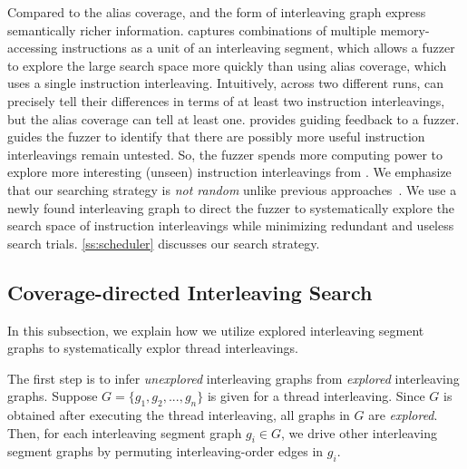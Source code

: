 %
%
Compared to the alias coverage, \intcov and the form of interleaving graph
express semantically richer information. \Intcov captures combinations 
of multiple memory-accessing instructions as a unit of an interleaving segment, which allows a fuzzer to explore the large search space more quickly than using alias coverage, which uses a single instruction interleaving. Intuitively, across two different runs, \intcov can precisely tell 
their differences in terms of at least two instruction interleavings, 
but the alias coverage can tell at least one.
\Intcov provides guiding feedback to a fuzzer.
\Intcov guides the fuzzer to identify that there are possibly more useful instruction interleavings remain untested. So, the fuzzer spends
more computing power to explore more interesting (unseen) instruction interleavings from \intcov. We emphasize that our searching strategy is 
\textit{not random} unlike previous approaches~\cite{krace, ski, pctalgorithm, muzz}.
%
We use a newly found interleaving graph to
direct the fuzzer to systematically explore the search space of
instruction interleavings while minimizing redundant and useless
search trials. \autoref{ss:scheduler} discusses our search strategy.


\subsection{Coverage-directed Interleaving Search}
\label{ss:scheduler}
%
In this subsection, we explain how we utilize explored interleaving
segment graphs to systematically explor thread interleavings.

%
%
The first step is to infer \textit{unexplored} interleaving graphs
from \textit{explored} interleaving graphs.
%
Suppose $G = \{g_1, g_2, ..., g_n \}$ is given for a thread
interleaving.
%
Since $G$ is obtained after executing the thread interleaving, all
graphs in $G$ are \textit{explored}.
%
Then, for each interleaving segment graph $g_i \in G$, we drive other
interleaving segment graphs by permuting interleaving-order edges in
$g_i$.



